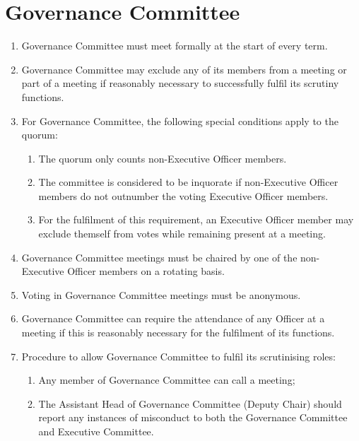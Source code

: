 \documentclass[12pt]{article}
\begin{document}
\section{Governance Committee}
\begin{enumerate}
    \item Governance Committee must meet formally at the start of every term.
    \item Governance Committee may exclude any of its members from a meeting or part of a meeting if reasonably necessary to successfully fulfil its scrutiny functions.
    \item For Governance Committee, the following special conditions apply to the quorum:
    \begin{enumerate}
        \item The quorum only counts non-Executive Officer members.
        \item The committee is considered to be inquorate if non-Executive Officer members do not outnumber the voting Executive Officer members.
        \item For the fulfilment of this requirement, an Executive Officer member may exclude themself from votes while remaining present at a meeting.
    \end{enumerate}
    \item Governance Committee meetings must be chaired by one of the non-Executive Officer members on a rotating basis.
    \item Voting in Governance Committee meetings must be anonymous.
    \item Governance Committee can require the attendance of any Officer at a meeting if this is reasonably necessary for the fulfilment of its functions.
    \item Procedure to allow Governance Committee to fulfil its scrutinising roles:
    \begin{enumerate}
        \item Any member of Governance Committee can call a meeting;
        \item The Assistant Head of Governance Committee (Deputy Chair) should report any instances of misconduct to both the Governance Committee and Executive Committee.
    \end{enumerate}
\end{enumerate}
\end{document}
